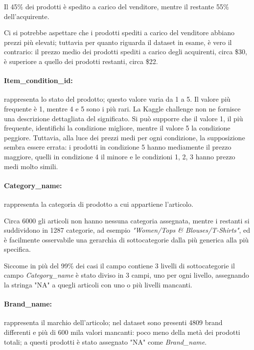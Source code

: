 Il 45\% dei prodotti è spedito a carico del venditore, mentre il
restante 55\% dell'acquirente.

Ci si potrebbe aspettare che i prodotti spediti a carico del venditore abbiano
prezzi più elevati; tuttavia  per quanto riguarda il dataset in
esame, è vero il contrario: il prezzo medio dei prodotti spediti a carico degli
acquirenti, circa \$30, è superiore a quello dei prodotti restanti,
circa \$22.


\paragraph{Item\_condition\_id:} rappresenta lo stato del prodotto; questo valore
varia da 1 a 5. Il valore più frequente è 1, mentre 4 e 5 sono i più rari. La
Kaggle challenge non ne fornisce una descrizione dettagliata del significato. Si
può supporre che il valore 1, il più frequente, identifichi la condizione
migliore, mentre il valore 5 la condizione peggiore. Tuttavia, alla luce dei
prezzi medi per ogni condizione, la supposizione sembra essere errata: i
prodotti in condizione 5 hanno mediamente il prezzo maggiore, quelli in
condizione 4 il minore e le condizioni 1, 2, 3 hanno prezzo medi molto simili.

\paragraph{Category\_name:} rappresenta la categoria di prodotto a cui appartiene
l'articolo.

Circa 6000 gli articoli non hanno nessuna categoria assegnata, mentre i
restanti si suddividono in 1287 categorie, ad esempio \textit{"Women/Tops \&
Blouses/T-Shirts"}, ed è facilmente osservabile una gerarchia di
sottocategorie dalla più generica alla più specifica.


Siccome in più del 99\% dei casi il campo contiene 3 livelli di sottocategorie
il campo \textit{Category\_name} è stato diviso in 3 campi, uno per ogni livello,
assegnando la stringa "NA" a quegli articoli con uno o più livelli mancanti.

\paragraph{Brand\_name:} rappresenta il marchio dell'articolo; nel dataset sono
presenti 4809 brand differenti e più di 600 mila valori mancanti: poco meno
della metà dei prodotti totali; a questi prodotti è stato assegnato "NA" come \textit{Brand\_name}.

